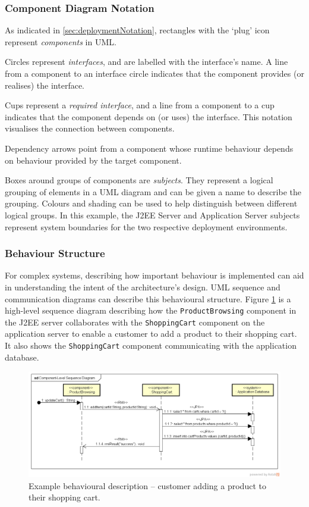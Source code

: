 \subsubsection{Component Diagram Notation}\label{sec:componentNotation}
As indicated in \ref{sec:deploymentNotation}, rectangles with the `plug' icon represent \emph{components} in UML.

Circles represent \emph{interfaces}, and are labelled with the interface's name.
A line from a component to an interface circle indicates that the component provides (or realises) the interface.

Cups represent a \emph{required interface}, and a line from a component to a cup indicates that the component depends on (or uses) the interface.
This notation visualises the connection between components.

Dependency arrows point from a component whose runtime behaviour depends on behaviour provided by the target component.

Boxes around groups of components are \emph{subjects}.
They represent a logical grouping of elements in a UML diagram and can be given a name to describe the grouping.
Colours and shading can be used to help distinguish between different logical groups.
In this example, the J2EE Server and Application Server subjects represent system boundaries for the two respective deployment environments.

\subsubsection{Behaviour Structure}\label{sec:behaviourStruct}
For complex systems, describing how important behaviour is implemented can aid in understanding the intent of the architecture's design.
UML sequence and communication diagrams can describe this behavioural structure.
Figure \ref{fig:sequenceDiagram} is a high-level sequence diagram describing how the
\texttt{ProductBrowsing} component in the J2EE server collaborates with the
\texttt{ShoppingCart} component on the application server to enable a customer to add a product to their shopping cart.
It also shows the \texttt{ShoppingCart} component communicating with the application database.

\begin{figure}[h!]
    \centering
    \includegraphics[trim=28 75 23 44,clip,width=\textwidth]{images/uml/component-level_sequence_diagram.png}
    \caption{Example behavioural description -- customer adding a product to their shopping cart.}
    \label{fig:sequenceDiagram}
\end{figure}

